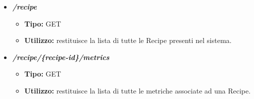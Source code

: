 \begin{itemize}

  \item \textit{\textbf{/recipe}}
  \begin{itemize}
    \item \textbf{Tipo:} GET
    \item \textbf{Utilizzo:} restituisce la lista di tutte le Recipe presenti nel sistema.
  \end{itemize}
  \item \textit{\textbf{/recipe/\{recipe-id\}/metrics}}
  \begin{itemize}
    \item \textbf{Tipo:} GET
    \item \textbf{Utilizzo:} restituisce la lista di tutte le metriche associate ad una Recipe.
  \end{itemize}


\end{itemize}
